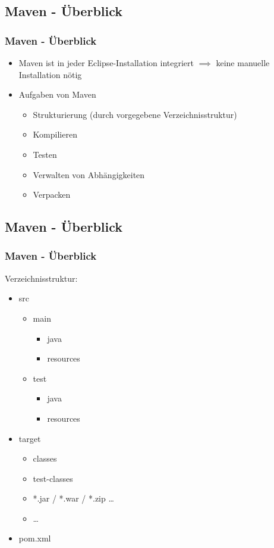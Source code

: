 \documentclass[18pt]{beamer}
\begin{document}
	\subsection{Maven - Überblick}
	\begin{frame}
		\frametitle{Maven - Überblick}
		\begin{itemize}
			\item Maven ist in jeder Eclipse-Installation integriert \linebreak $\implies$ keine manuelle Installation nötig
			\item Aufgaben von Maven
				\begin{itemize}
					\item Strukturierung (durch vorgegebene Verzeichnisstruktur)
					\item Kompilieren
					\item Testen
					\item Verwalten von Abhängigkeiten
					\item Verpacken
				\end{itemize}
		\end{itemize}
	\end{frame}
	
	\subsection{Maven - Überblick}
	\begin{frame}
		\frametitle{Maven - Überblick}
		Verzeichnisstruktur:
		\begin{itemize}
			\item src
			\begin{itemize}
				\item main
				\begin{itemize}
					\item java
					\item resources
				\end{itemize}
				\item test
				\begin{itemize}
					\item java
					\item resources
				\end{itemize}
			\end{itemize}
			\item target
			\begin{itemize}
				\item classes
				\item test-classes
				\item *.jar / *.war / *.zip \dots
				\item \dots
			\end{itemize}
			\item pom.xml
		\end{itemize}
	\end{frame}
	
\end{document}
